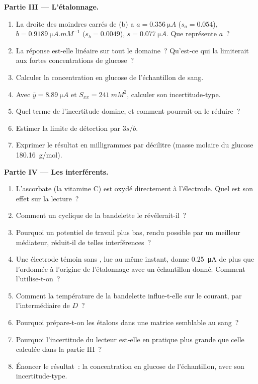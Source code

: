 \begin{problem}
\medskip\noindent\textbf{Partie III --- L'étalonnage.}
\begin{enumerate}[resume]
  \item La droite des moindres carrés de (b) a $a = \qty{0.356}{\micro A}$ ($s_a = 0.054$), $b =
        \qty{0.9189}{\micro A.mM^{-1}}$ ($s_b = 0.0049$), $s = \qty{0.077}{\micro A}$.
        Que représente $a$~?
  \item La réponse est-elle linéaire sur tout le domaine~? Qu'est-ce qui
        la limiterait aux fortes concentrations de glucose~?
  \item Calculer la concentration en glucose de l'échantillon de sang.
  \item Avec $\bar y = \qty{8.89}{\micro A}$ et $S_{xx} = \qty{241}{mM^2}$,
        calculer son incertitude-type.
  \item Quel terme de l'incertitude domine, et comment pourrait-on le
        réduire~?
  \item Estimer la limite de détection par $3s/b$.
  \item Exprimer le résultat en milligrammes par décilitre (masse molaire
        du glucose
        \qty{180.16}{g/mol}).
\end{enumerate}

\medskip\noindent\textbf{Partie IV --- Les interférents.}
\begin{enumerate}[resume]
  \item L'ascorbate (la vitamine C) est oxydé directement à l'électrode.
        Quel est son effet sur la lecture~?
  \item Comment un  cyclique de la bandelette le
        révélerait-il~?
  \item Pourquoi un potentiel de travail plus bas, rendu possible par un
        meilleur médiateur, réduit-il de telles interférences~?
  \item Une électrode témoin sans , lue au même instant, donne
        \qty{0.25}{\micro A} de plus que l'ordonnée à l'origine de
        l'étalonnage avec un échantillon donné. Comment l'utilise-t-on~?
  \item Comment la température de la bandelette influe-t-elle sur le
        courant, par l'intermédiaire de $D$~?
  \item Pourquoi prépare-t-on les étalons dans une matrice semblable au
        sang~?
  \item Pourquoi l'incertitude du lecteur est-elle en pratique plus
        grande que celle calculée dans la partie III~?
  \item Énoncer le résultat~: la concentration en glucose de
        l'échantillon, avec son incertitude-type.
\end{enumerate}
\end{problem}
